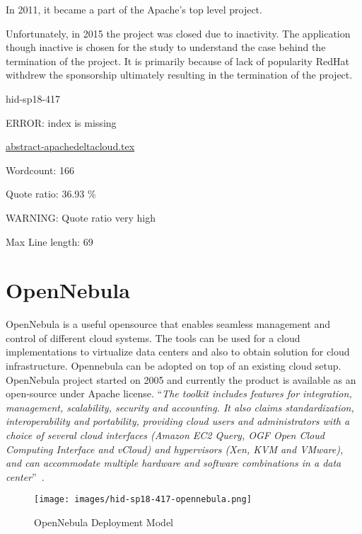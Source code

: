In 2011, it became a part of the Apache’s top level project. 

Unfortunately, in 2015 the project was closed due to inactivity.  The
application though inactive is chosen for the study to understand the
case behind the termination of the project.  It is primarily because
of lack of popularity RedHat withdrew the sponsorship ultimately
resulting in the termination of the project.


\begin{IU}

hid-sp18-417

ERROR: index is missing

\href{https://github.com/cloudmesh-community/hid-sp18-417/blob/master//technology/abstract-apachedeltacloud.tex}{abstract-apachedeltacloud.tex}

 

Wordcount: 166


Quote ratio: 36.93 \%

WARNING: Quote ratio very high
 
Max Line length: 69
\end{IU}


\section{OpenNebula}

OpenNebula is a useful opensource that enables seamless management and
control of different cloud systems.  The tools can be used for a cloud
implementations to virtualize data centers and also to obtain solution
for cloud infrastructure.  Opennebula can be adopted on top of an
existing cloud setup.  OpenNebula project started on 2005 and
currently the product is available as an open-source under Apache
license.
\color{blue}``\emph{The toolkit includes features for integration, management,
scalability, security and accounting.  It also claims standardization,
interoperability and portability, providing cloud users and
administrators with a choice of several cloud interfaces (Amazon EC2
Query, OGF Open Cloud Computing Interface and vCloud) and hypervisors
(Xen, KVM and VMware), and can accommodate multiple hardware and
software combinations in a data
center}''\color{black}~\cite{hid-sp18-417-opennebula-wiki}.

\begin{figure}[htb]
\texttt{[image: images/hid-sp18-417-opennebula.png]}
\caption{OpenNebula Deployment Model~\cite{hid-sp18-417-opennebula-deployment}} 
\label{F:opennebula}
\end{figure}


